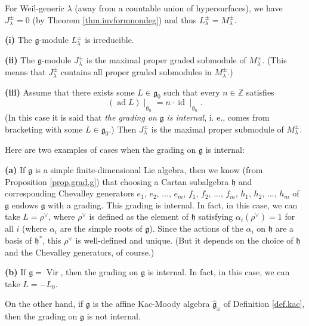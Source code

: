\documentclass[etingof-lie.tex]{subfiles}
\begin{document}
\begin{remark}
For Weil-generic $\lambda$ (away from a countable union of hypersurfaces), we
have $J_{\lambda}^{\pm}=0$ (by Theorem \ref{thm.invformnondeg}) and thus
$L_{\lambda}^{\pm}=M_{\lambda}^{\pm}$.
\end{remark}

\begin{theorem}
\label{thm.verma}\textbf{(i)} The $\mathfrak{g}$-module $L_{\lambda}^{\pm}$ is irreducible.

\textbf{(ii)} The $\mathfrak{g}$-module $J_{\lambda}^{\pm}$ is the maximal
proper graded submodule of $M_{\lambda}^{\pm}$. (This means that $J_{\lambda
}^{\pm}$ contains all proper graded submodules in $M_{\lambda}^{\pm}$.)

\textbf{(iii)} Assume that there exists some $L\in\mathfrak{g}_{0}$ such that
every $n\in\mathbb{Z}$ satisfies
\[
\left(  \operatorname*{ad}L\right)  \mid_{\mathfrak{g}_{n}}=n\cdot
\operatorname*{id}\mid_{\mathfrak{g}_{n}}.
\]
(In this case it is said that \textit{the grading on }$\mathfrak{g}$
\textit{is internal}, i. e., comes from bracketing with some $L\in
\mathfrak{g}_{0}$.) Then $J_{\lambda}^{\pm}$ is the maximal proper submodule
of $M_{\lambda}^{\pm}$.
\end{theorem}

\begin{remark}
Here are two examples of cases when the grading on $\mathfrak{g}$ is internal:

\textbf{(a)} If $\mathfrak{g}$ is a simple finite-dimensional Lie algebra,
then we know (from Proposition \ref{prop.grad.g}) that choosing a Cartan
subalgebra $\mathfrak{h}$ and corresponding Chevalley generators $e_{1}$,
$e_{2}$, $...$, $e_{m}$, $f_{1}$, $f_{2}$, $...$, $f_{m}$, $h_{1}$, $h_{2}$,
$...$, $h_{m}$ of $\mathfrak{g}$ endows $\mathfrak{g}$ with a grading. This
grading is internal. In fact, in this case, we can take $L=\rho^{\vee}$, where
$\rho^{\vee}$ is defined as the element of $\mathfrak{h}$ satisfying
$\alpha_{i}\left(  \rho^{\vee}\right)  =1$ for all $i$ (where $\alpha_{i}$ are
the simple roots of $\mathfrak{g}$). Since the actions of the $\alpha_{i}$ on
$\mathfrak{h}$ are a basis of $\mathfrak{h}^{\ast}$, this $\rho^{\vee}$ is
well-defined and unique. (But it depends on the choice of $\mathfrak{h}$ and
the Chevalley generators, of course.)

\textbf{(b)} If $\mathfrak{g}=\operatorname*{Vir}$, then the grading on
$\mathfrak{g}$ is internal. In fact, in this case, we can take $L=-L_{0}$.

On the other hand, if $\mathfrak{g}$ is the affine Kac-Moody algebra
$\widehat{\mathfrak{g}}_{\omega}$ of Definition \ref{def.kac}, then the
grading on $\mathfrak{g}$ is not internal.
\end{remark}
\end{document}
